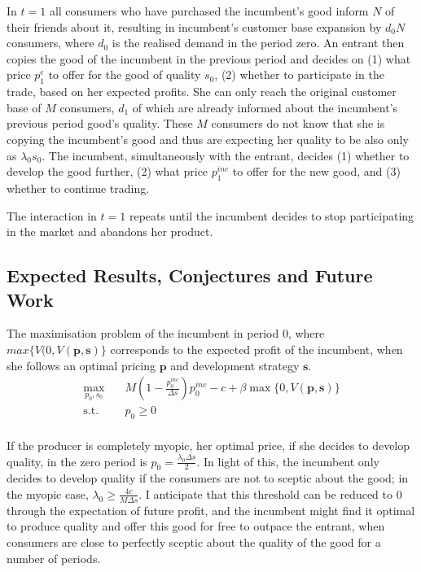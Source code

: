 \documentclass[13pt]{article}
\numberwithin{figure}{section}
\numberwithin{table}{section}
\theoremstyle{indented}
\numberwithin{equation}{section} %
\begin{document}
In $t=1$ all consumers who have purchased the incumbent's good inform $N$ of their friends about it, resulting in incumbent's customer base expansion by $d_0N$ consumers, where $d_0$ is the realised demand in the period zero. An entrant then copies the good of the incumbent in the previous period and decides on (1) what price $p_1^{e}$ to offer for the good of quality $s_0$, (2) whether to participate in the trade, based on her expected profits. She can only reach the original customer base of $M$ consumers, $d_1$ of which are already informed about the incumbent's previous period good's quality. These $M$ consumers do not know that she is copying the incumbent's good and thus are expecting her quality to be also only as $\lambda_0 s_0$. The incumbent, simultaneously with the entrant, decides (1) whether to develop the good further, (2) what price $p_1^{inc}$ to offer for the new good, and (3) whether to continue trading. 

The interaction in $t=1$ repeats until the incumbent decides to stop participating in the market and abandons her product. 

\subsection{Expected Results, Conjectures and Future Work} 
 The maximisation problem of the incumbent in period 0, where $max\{V(0, V(\textbf{p}, \textbf{s})\}$ corresponds to the expected profit of the incumbent, when she follows an optimal pricing $\textbf{p}$ and development strategy $\textbf{s}$. 
$$
\begin{aligned}
\max_{p_0,s_0} \quad &  M(1-\tfrac{p_0^{inc}}{\Delta s})p_0^{inc} - c + \beta \max\{0, V(\textbf{p}, \textbf{s})\}\\
\textrm{s.t.} \quad &p_0 \geq 0\\
\end{aligned}
$$

If the producer is completely myopic, her optimal price, if she decides to develop quality, in the zero period is $p_0=\tfrac{\lambda_0 \Delta s }{2}$. In light of this, the incumbent only decides to develop quality if the consumers are not to sceptic about the good; in the myopic case, $\lambda_0 \geq \tfrac{4c}{M\Delta s}$. I anticipate that this threshold can be reduced to 0 through the expectation of future profit, and the incumbent might find it optimal to produce quality and offer this good for free to outpace the entrant, when consumers are close to perfectly sceptic about the quality of the good for a number of periods.
\end{document}
